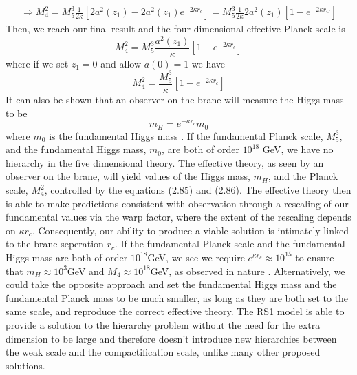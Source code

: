 \documentclass[11pt]{report}
\numberwithin{equation}{chapter}
\begin{document}
\begin{equation}
    \begin{aligned}
        \Rightarrow M^2_4 = M^3_5\frac{1}{2\kappa}[2a^2(z_1) - 2a^2(z_1)e^{-2\kappa r_c}]= M^3_5\frac{1}{2\kappa}2a^2(z_1)[1-e^{-2\kappa r_C}]
    \end{aligned}
\end{equation}
Then, we reach our final result and the four dimensional effective Planck scale is
\begin{equation}
     M^2_4 = M^3_5\frac{a^2(z_1)}{\kappa}[1-e^{-2\kappa r_c}]
\end{equation}
where if we set $z_1 = 0$ and allow $a(0)=1$ we have
\begin{equation}
     M^2_4 = \frac{M^3_5}{\kappa}[1-e^{-2\kappa r_c}]
\end{equation}
It can also be shown that an observer on the brane will measure the Higgs mass to be
\begin{equation}
    m_H = e^{-\kappa r_c}m_0
\end{equation}
where $m_0$ is the fundamental Higgs mass \cite{padilla2002braneworld}.
If the fundamental Planck scale, $M^3_5$, and the fundamental Higgs mass, $m_0$, are both of order $10^{18}$ GeV, we have no hierarchy in the five dimensional theory. The effective theory, as seen by an observer on the brane, will yield values of the Higgs mass, $m_H$, and the Planck scale, $M^2_4$, controlled by the equations (2.85) and (2.86). The effective theory then is able to make predictions consistent with observation through a rescaling of our fundamental values via the warp factor, where the extent of the rescaling depends on $\kappa r_c$. Consequently, our ability to produce a viable solution is intimately linked to the brane seperation $r_c$. If the fundamental Planck scale and the fundamental Higgs mass are both of order $10^{18}$GeV, we see we require $e^{\kappa r_c} \approx 10^{15}$ to ensure that $m_H \approx 10^3$GeV and $M_4 \approx 10^{18}$GeV, as observed in nature \cite{padilla2002braneworld}. Alternatively, we could take the opposite approach and set the fundamental Higgs mass and the fundamental Planck mass to be much smaller, as long as they are both set to the same scale, and reproduce the correct effective theory. The RS1 model is able to provide a solution to the hierarchy problem without the need for the extra dimension to be large and therefore doesn't introduce new hierarchies between the weak scale and the compactification scale, unlike many other proposed solutions. 
\end{document}
